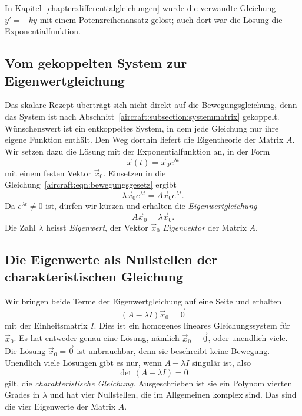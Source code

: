 In Kapitel~\ref{chapter:differentialgleichungen} wurde die verwandte Gleichung
$y' = -ky$ mit einem Potenzreihenansatz gelöst; auch dort war die
Lösung die Exponentialfunktion.

\subsection{Vom gekoppelten System zur Eigenwertgleichung
\label{aircraft:subsection:eigenwertgleichung}}
Das skalare Rezept überträgt sich nicht direkt auf die
Bewegungsgleichung, denn das System ist nach
Abschnitt~\ref{aircraft:subsection:systemmatrix} gekoppelt.
Wünschenswert ist ein entkoppeltes System, in dem jede Gleichung nur
ihre eigene Funktion enthält.
Den Weg dorthin liefert die Eigentheorie der Matrix $A$.
Wir setzen dazu die Lösung mit der Exponentialfunktion an, in der
Form
\begin{equation}
    \vec{x}(t)
    =
    \vec{x}_0 e^{\lambda t}
    \label{aircraft:eqn:ansatz}
\end{equation}
mit einem festen Vektor $\vec{x}_0$.
Einsetzen in die Gleichung~\eqref{aircraft:eqn:bewegungsgesetz}
ergibt
\begin{equation}
    \lambda \vec{x}_0 e^{\lambda t}
    =
    A \vec{x}_0 e^{\lambda t}.
    \label{aircraft:eqn:eingesetzt}
\end{equation}
Da $e^{\lambda t} \neq 0$ ist, dürfen wir kürzen und erhalten die
\emph{Eigenwertgleichung}
\begin{equation}
    A \vec{x}_0
    =
    \lambda \vec{x}_0.
    \label{aircraft:eqn:eigenwertgleichung}
\end{equation}
Die Zahl $\lambda$ heisst \emph{Eigenwert}, der Vektor $\vec{x}_0$
\emph{Eigenvektor} der Matrix $A$.
%
%

\subsection{Die Eigenwerte als Nullstellen der charakteristischen
Gleichung
\label{aircraft:subsection:charakteristische-gleichung}}
Wir bringen beide Terme der Eigenwertgleichung auf eine Seite und
erhalten
\begin{equation}
(A - \lambda I)\vec{x}_0
=
\vec{0}
\label{aircraft:eqn:homogen}
\end{equation}
mit der Einheitsmatrix $I$.
Dies ist ein homogenes lineares Gleichungssystem für $\vec{x}_0$.
Es hat entweder genau eine Lösung, nämlich $\vec{x}_0 = \vec{0}$,
oder unendlich viele.
Die Lösung $\vec{x}_0 = \vec{0}$ ist unbrauchbar, denn sie beschreibt
keine Bewegung.
Unendlich viele Lösungen gibt es nur, wenn $A - \lambda I$ singulär
ist, also
\begin{equation}
    \det(A - \lambda I)
    =
    0
    \label{aircraft:eqn:charakteristisch}
\end{equation}
gilt, die \emph{charakteristische Gleichung}.
%
Ausgeschrieben ist sie ein Polynom vierten Grades in $\lambda$ und
hat vier Nullstellen, die im Allgemeinen komplex sind.
Das sind die vier Eigenwerte der Matrix $A$.
